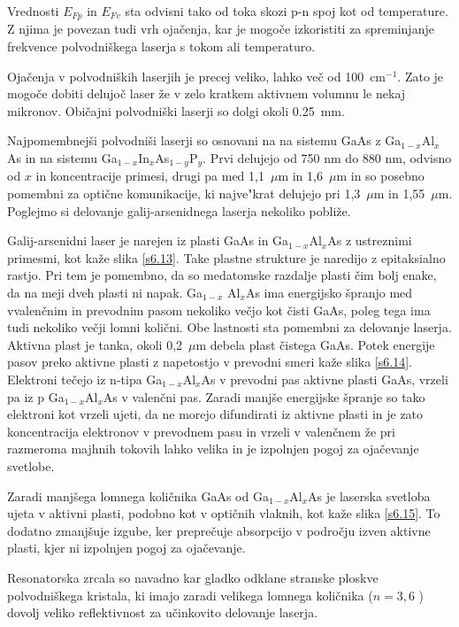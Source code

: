 Vrednosti $E_{Fp}$ in $E_{Fv}$ sta odvisni tako od toka skozi p-n spoj kot
od temperature. Z njima je povezan tudi vrh ojačenja, kar je mogoče
izkoristiti za spreminjanje frekvence polvodniškega laserja s tokom ali
temperaturo.

Ojačenja v polvodniških laserjih je precej veliko, lahko več od 100~cm$%
^{-1}$. Zato je mogoče dobiti delujoč laser že v zelo kratkem aktivnem
volumnu le nekaj mikronov. Običajni polvodniški laserji so dolgi okoli
0.25~mm.

Najpomembnejši polvodniši laserji so osnovani na na sistemu GaAs z Ga$%
_{1-x}$Al$_{x}$As in na sistemu Ga$_{1- x}$In$_{x}$As$_{1-y}$P$_y$. Prvi
delujejo od 750 nm do 880 nm, odvisno od $x$ in koncentracije primesi, drugi
pa med 1,1~$\mu$m in 1,6~$\mu$m in so posebno pomembni za optične
komunikacije, ki najve"krat delujejo pri 1,3~$\mu$m in 1,55~$\mu$m. Poglejmo
si delovanje galij-arsenidnega laserja nekoliko pobliže.

Galij-arsenidni laser je narejen iz plasti GaAs in Ga$_{1- x}$Al$_x$As z
ustreznimi primesmi, kot kaže slika \ref{s6.13}. Take plastne strukture je
naredijo z epitaksialno rastjo. Pri tem je pomembno, da so medatomske
razdalje plasti čim bolj enake, da na meji dveh plasti ni napak. Ga$_{1-x}$%
Al$_x$As ima energijsko špranjo med vvalenčnim in prevodnim pasom nekoliko
večjo kot čisti GaAs, poleg tega ima tudi nekoliko večji lomni količni.
Obe lastnosti sta pomembni za delovanje laserja. Aktivna plast je tanka,
okoli 0,2~$\mu$m debela plast čistega GaAs. Potek energije pasov preko
aktivne plasti z napetostjo v prevodni smeri kaže slika \ref{s6.14}.
Elektroni tečejo iz n-tipa Ga$_{1-x}$Al$_x$As v prevodni pas aktivne plasti
GaAs, vrzeli pa iz p Ga$_{1-x}$Al$_x$As v valenčni pas. Zaradi manjše
energijske špranje so tako elektroni kot vrzeli ujeti, da ne morejo
difundirati iz aktivne plasti in je zato koncentracija elektronov v
prevodnem pasu in vrzeli v valenčnem že pri razmeroma majhnih tokovih
lahko velika in je izpolnjen pogoj za ojačevanje svetlobe.

Zaradi manjšega lomnega količnika GaAs od Ga$_{1- x}$Al$_x$As je laserska
svetloba ujeta v aktivni plasti, podobno kot v optičnih vlaknih, kot kaže
slika \ref{s6.15}. To dodatno zmanjšuje izgube, ker preprečuje absorpcijo
v področju izven aktivne plasti, kjer ni izpolnjen pogoj za ojačevanje.

Resonatorska zrcala so navadno kar gladko odklane stranske ploskve
polvodniškega kristala, ki imajo zaradi velikega lomnega količnika ($n=3,6$%
) dovolj veliko reflektivnost za učinkovito delovanje laserja.

